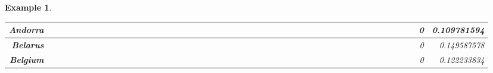 \documentclass[a4paper,11pt]{report}
\newtheorem{example}[theorem]{Example}
\begin{document}
\begin{example}
\begin{appendices}
\begin{landscape}
\begin{longtable}{r|r|r|r|r|r|r|r|r|r|r|r|r|r|r|r|r|r|r|r|r|r|r|r|r|r|r|r|r|r|r|r|r|r|r|r|r|r|r|r|r|r|r|r|r|r|r|}
\multicolumn{1}{|r|}{\textbf{Andorra}}               &                  &                  &                  &                     &                  &                  &                                &                   &                  &                 &                         &                  &                  &                           &                  &                 &                  &                 &                  &                  &                  &                 &                 &                    &                &                  &                     &                 &                 &                   &                  &                 &                 &                   &                   &                &                 &                      &                          &                 &                  &                         &                 &                & 0                        & 0.109781594        \\ \hline
\multicolumn{1}{|r|}{\textbf{Belarus}}               &                  &                  &                  &                     &                  &                  &                                &                   &                  &                 &                         &                  &                  &                           &                  &                 &                  &                 &                  &                  &                  &                 &                 &                    &                &                  &                     &                 &                 &                   &                  &                 &                 &                   &                   &                &                 &                      &                          &                 &                  &                         &                 &                & 0                        & 0.149587578        \\ \hline
\multicolumn{1}{|r|}{\textbf{Belgium}}               &                  &                  &                  &                     &                  &                  &                                &                   &                  &                 &                         &                  &                  &                           &                  &                 &                  &                 &                  &                  &                  &                 &                 &                    &                &                  &                     &                 &                 &                   &                  &                 &                 &                   &                   &                &                 &                      &                          &                 &                  &                         &                 &                & 0                        & 0.122233834        \\ \hline

\end{longtable}
\end{landscape}
\end{appendices}
\end{example}
\end{document}
